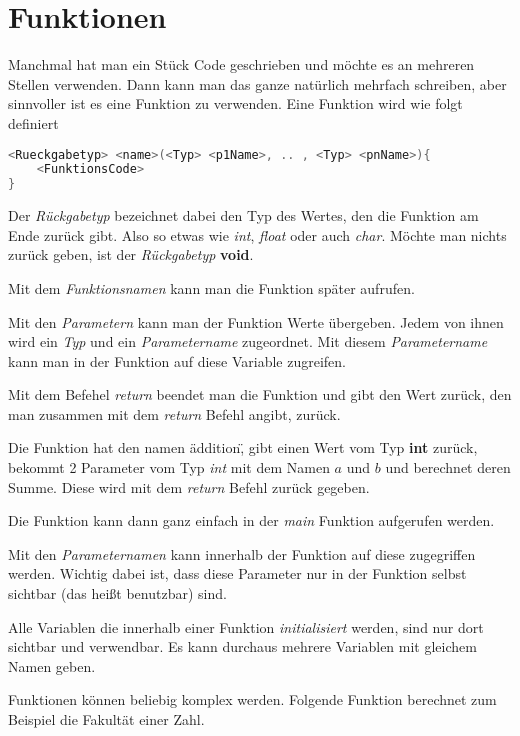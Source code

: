 \documentclass[c_worksheet.tex]{subfiles}
\begin{document}




\section{Funktionen}

Manchmal hat man ein Stück Code geschrieben und möchte es an mehreren Stellen verwenden. Dann kann man das ganze natürlich mehrfach schreiben, aber sinnvoller ist es eine Funktion zu verwenden. Eine Funktion wird wie folgt definiert

\begin{lstlisting}[language=c]
<Rueckgabetyp> <name>(<Typ> <p1Name>, .. , <Typ> <pnName>){
	<FunktionsCode>
}
\end{lstlisting}

Der \emph{Rückgabetyp} bezeichnet dabei den Typ des Wertes, den die Funktion am Ende zurück gibt. Also so etwas wie \emph{int}, \emph{float} oder auch \emph{char}. Möchte man nichts zurück geben, ist der \emph{Rückgabetyp} \textbf{void}.

Mit dem \emph{Funktionsnamen} kann man die Funktion später aufrufen.

Mit den \emph{Parametern} kann man der Funktion Werte übergeben. Jedem von ihnen wird ein \emph{Typ} und ein \emph{Parametername} zugeordnet. Mit diesem \emph{Parametername} kann man in der Funktion auf diese Variable zugreifen.

Mit dem Befehel \emph{return} beendet man die Funktion und gibt den Wert zurück, den man zusammen mit dem \emph{return} Befehl angibt, zurück.


 

Die Funktion hat den namen \"addition\", gibt einen Wert vom Typ \textbf{int} zurück, bekommt 2 Parameter vom Typ \emph{int} mit dem Namen \(a\) und \(b\) und berechnet deren Summe. Diese wird mit dem \emph{return} Befehl zurück gegeben.

Die Funktion kann dann ganz einfach in der \emph{main} Funktion aufgerufen werden.

 

Mit den \emph{Parameternamen} kann innerhalb der Funktion auf diese zugegriffen werden. Wichtig dabei ist, dass diese Parameter nur in der Funktion selbst sichtbar (das heißt benutzbar) sind.

Alle Variablen die innerhalb einer Funktion \emph{initialisiert} werden, sind nur dort sichtbar und verwendbar. Es kann durchaus mehrere Variablen mit gleichem Namen geben.

 

Funktionen können beliebig komplex werden. Folgende Funktion berechnet zum Beispiel die Fakultät einer Zahl.

 
\end{document}
